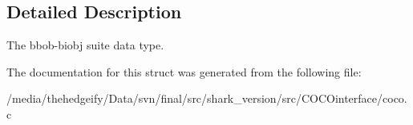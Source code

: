 \subsection{Detailed Description}
The bbob-\/biobj suite data type. 

The documentation for this struct was generated from the following file\+:\begin{DoxyCompactItemize}
\item 
/media/thehedgeify/\+Data/svn/final/src/shark\+\_\+version/src/\+C\+O\+C\+Ointerface/coco.\+c\end{DoxyCompactItemize}
